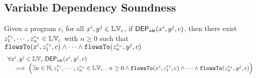 %
\clearpage
\subsection{Variable Dependency Soundness}
%
\begin{thm}
\label{thm:flowstovardep_sound}
Given a program ${c}$, for all  $ x^i, y^j \in \mathbb{LV}_{{c}}$, if $\mathsf{DEP_{var}}(x^i, y^j, {c})$,
then
there exist $z_1^{r_1}, \cdots, z_n^{r_n} \in \mathbb{LV}_{{c}}$ with $n \geq 0$ such that   
$\mathtt{flowsTo}(x^i,  z_1^{r_1}, c) 
\land \cdots \land \mathtt{flowsTo}(z_n^{r_n}, y^j, c)$
%
\[
\begin{array}{l}
  \forall x^i, y^j \in \mathbb{LV}_{{c}}.
  \mathsf{DEP_{var}}(x^i, y^j, {c})
  \\ \quad \implies
  \Big( \exists n \in \mathbb{N}, z_1^{r_1}, \cdots, z_n^{r_n} \in \mathbb{LV}_{{c}} ~.~ n \geq 0 \land
  \mathtt{flowsTo}(x^i,  z_1^{r_1}, c) 
  \land \cdots \land \mathtt{flowsTo}(z_n^{r_n}, y^j, c) \Big)
\end{array}
\]
\end{thm}
